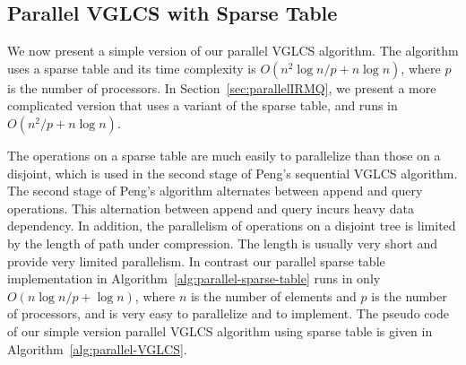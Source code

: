 \subsection{Parallel VGLCS with Sparse Table}

We now present a simple version of our parallel VGLCS algorithm.  The
algorithm uses a sparse table and its time complexity is $O(n^2 \log n
/ p + n \log n)$, where $p$ is the number of processors.  In
Section~\ref{sec:parallelIRMQ}, we present a more complicated version
that uses a variant of the sparse table, and runs in $O(n^2 / p + n
\log n)$.



The operations on a sparse table are much easily to parallelize than
those on a disjoint, which is used in the second stage of Peng's
sequential VGLCS algorithm.  The second stage of Peng's algorithm
alternates between append and query operations.  This alternation
between append and query incurs heavy data dependency.  In addition,
the parallelism of operations on a disjoint tree is limited by the
length of path under compression.  The length is usually very short
and provide very limited parallelism.  In contrast our parallel sparse
table implementation in Algorithm~\ref{alg:parallel-sparse-table} runs
in only $O(n \log n / p + \log n)$, where $n$ is the number of
elements and $p$ is the number of processors, and is very easy to
parallelize and to implement.  The pseudo code of our simple version
parallel VGLCS algorithm using sparse table is given in
Algorithm~\ref{alg:parallel-VGLCS}.


